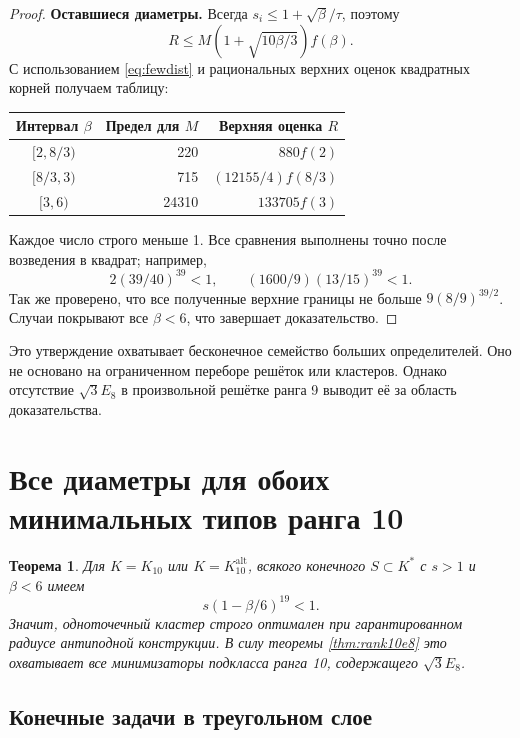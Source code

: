 \documentclass[11pt,a4paper]{article}
\newtheorem{theorem}{Теорема}[section]
\theoremstyle{remark}\newtheorem{remark}[theorem]{Замечание}
\newcommand{\Kalt}{K_{10}^{\mathrm{alt}}}
\begin{document}
\begin{proof}
\textbf{Оставшиеся диаметры.} Всегда $s_i\le1+\sqrt\beta/\tau$, поэтому
\[
R\le M(1+\sqrt{10\beta/3})f(\beta).
\]
С использованием \eqref{eq:fewdist} и рациональных верхних оценок квадратных корней получаем таблицу:
\begin{center}
\begin{tabular}{crr}
\toprule
Интервал $\beta$ & Предел для $M$ & Верхняя оценка $R$\\\midrule
$[2,8/3)$ &220&$880f(2)$\\
$[8/3,3)$ &715&$(12155/4)f(8/3)$\\
$[3,6)$ &24310&$133705f(3)$\\
\bottomrule
\end{tabular}
\end{center}
Каждое число строго меньше 1. Все сравнения выполнены точно после возведения в квадрат; например,
\[
2(39/40)^{39}<1,\qquad (1600/9)(13/15)^{39}<1.
\]
Так же проверено, что все полученные верхние границы не больше $9(8/9)^{39/2}$. Случаи покрывают все $\beta<6$, что завершает доказательство.
\end{proof}

Это утверждение охватывает бесконечное семейство больших определителей. Оно не основано на ограниченном переборе решёток или кластеров. Однако отсутствие $\sqrt3E_8$ в произвольной решётке ранга 9 выводит её за область доказательства.

\section{Все диаметры для обоих минимальных типов ранга 10}

\begin{theorem}\label{thm:cluster10}
Для $K=K_{10}$ или $K=\Kalt$, всякого конечного $S\subset K^*$ с $s>1$ и $\beta<6$ имеем
\[
s(1-\beta/6)^{19}<1.
\]
Значит, одноточечный кластер строго оптимален при гарантированном радиусе антиподной конструкции. В силу теоремы \ref{thm:rank10e8} это охватывает все минимизаторы подкласса ранга 10, содержащего $\sqrt3E_8$.
\end{theorem}

\subsection{Конечные задачи в треугольном слое}
\end{document}
